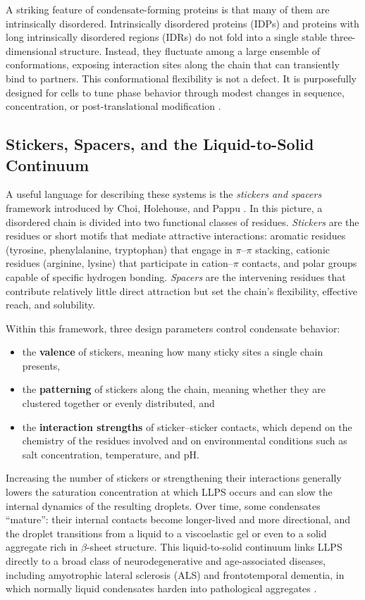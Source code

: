 A striking feature of condensate-forming proteins is that many of them are
intrinsically disordered. Intrinsically disordered proteins (IDPs) and proteins
with long intrinsically disordered regions (IDRs) do not fold into a single
stable three-dimensional structure. Instead, they fluctuate among a large
ensemble of conformations, exposing interaction sites along the chain that can
transiently bind to partners. This conformational flexibility is not a defect.
It is purposefully designed for cells to tune phase behavior through modest changes in sequence, concentration, or post-translational modification
\cite{Boeynaems2018PhaseSep,Uversky2015IDPs}.


\subsection{Stickers, Spacers, and the Liquid-to-Solid Continuum}

A useful language for describing these systems is the \emph{stickers and spacers}
framework introduced by Choi, Holehouse, and Pappu \cite{Choi2020Stickers}.
In this picture, a disordered chain is divided into two functional classes of
residues. \emph{Stickers} are the residues or short motifs that mediate
attractive interactions: aromatic residues (tyrosine, phenylalanine, tryptophan)
that engage in $\pi$--$\pi$ stacking, cationic residues (arginine, lysine) that
participate in cation--$\pi$ contacts, and polar groups capable of specific
hydrogen bonding. \emph{Spacers} are the intervening residues that contribute
relatively little direct attraction but set the chain's flexibility, effective
reach, and solubility.

Within this framework, three design parameters control condensate behavior:

\begin{itemize}
  \item the \textbf{valence} of stickers, meaning how many sticky sites a single
        chain presents,
  \item the \textbf{patterning} of stickers along the chain, meaning whether they
        are clustered together or evenly distributed, and
  \item the \textbf{interaction strengths} of sticker--sticker contacts, which
        depend on the chemistry of the residues involved and on environmental
        conditions such as salt concentration, temperature, and pH.
\end{itemize}

Increasing the number of stickers or strengthening their interactions generally
lowers the saturation concentration at which LLPS occurs and can slow the
internal dynamics of the resulting droplets. Over time, some condensates
``mature'': their internal contacts become longer-lived and more directional,
and the droplet transitions from a liquid to a viscoelastic gel or even to a
solid aggregate rich in $\beta$-sheet structure. This liquid-to-solid continuum links LLPS directly to a broad class of
neurodegenerative and age-associated diseases, including amyotrophic lateral
sclerosis (ALS) and frontotemporal dementia, in which normally liquid condensates
harden into pathological aggregates \cite{Alberti2019Aging,Patel2015Nucleation}.

